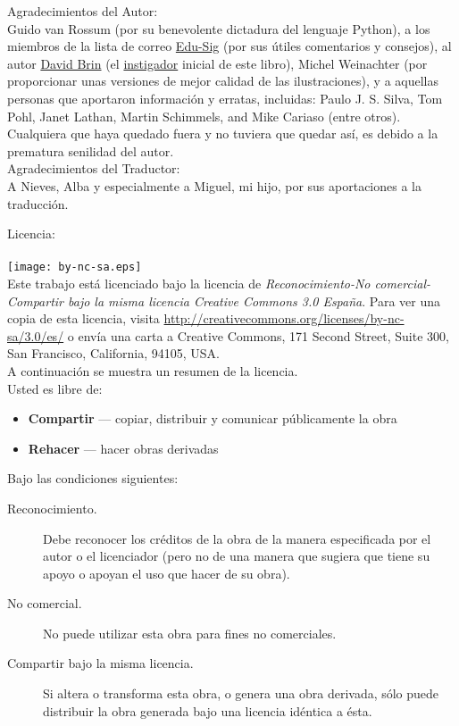 \noindent
Agradecimientos del Autor:\\
Guido van Rossum (por su benevolente dictadura del lenguaje Python), a los miembros de la lista de correo \href{http://www.python.org/community/sigs/current/edu-sig/}{Edu-Sig} (por sus útiles comentarios y consejos), al autor \href{http://www.davidbrin.com/}{David Brin} (el \href{http://www.salon.com/tech/feature/2006/09/14/basic/}{instigador} inicial de este libro), Michel Weinachter (por proporcionar unas versiones de mejor calidad de las ilustraciones), y a aquellas personas que aportaron información y erratas, incluidas: Paulo J. S. Silva, Tom Pohl, Janet Lathan, Martin Schimmels, and Mike Cariaso (entre otros).  Cualquiera que haya quedado fuera y no tuviera que quedar así, es debido a la prematura senilidad del autor.\\

\noindent
Agradecimientos del Traductor:\\
A Nieves, Alba y especialmente a Miguel, mi hijo, por sus aportaciones a la traducción.

\noindent
Licencia:\\
\\
\texttt{[image: by-nc-sa.eps]}\\
Este trabajo está licenciado bajo la licencia de \emph{Reconocimiento-No comercial-Compartir bajo la misma licencia Creative Commons 3.0 España}. Para ver una copia de esta licencia, visita \href{http://creativecommons.org/licenses/by-nc-sa/3.0/es/}{http://creativecommons.org/licenses/by-nc-sa/3.0/es/} o envía una carta a Creative Commons, 171 Second Street, Suite 300, San Francisco, California, 94105, USA.\\

\noindent
A continuación se muestra un resumen de la licencia.\\

\noindent
Usted es libre de:
\begin{itemize}
 \item \textbf{Compartir} — copiar, distribuir y comunicar públicamente la obra 
 \item \textbf{Rehacer} — hacer obras derivadas
\end{itemize}
\noindent
Bajo las condiciones siguientes:
\begin{description}
 \item[Reconocimiento.] Debe reconocer los créditos de la obra de la manera especificada por el autor o el licenciador (pero no de una manera que sugiera que tiene su apoyo o apoyan el uso que hacer de su obra).
 \item[No comercial.] No puede utilizar esta obra para fines no comerciales.
 \item[Compartir bajo la misma licencia.] Si altera o transforma esta obra, o genera una obra derivada, sólo puede distribuir la obra generada bajo una licencia idéntica a ésta. 
\end{description}

